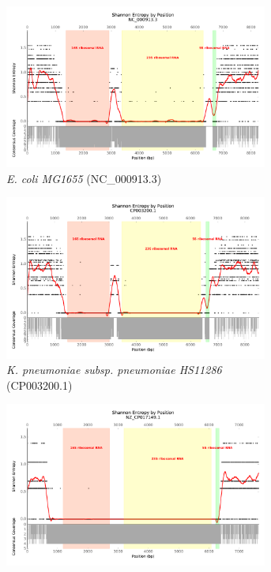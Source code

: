 \documentclass[10pt]{article}
\begin{document}
\begin{figure}[h]
  \centering
  \begin{subfigure}[b]{.45\textwidth}
    \includegraphics[width=0.95\textwidth]{gage_entropy_figures/NC_000913.3_entropy_plot}
    \caption{\textit{E. coli MG1655} (NC\_000913.3)}
    \label{fig:ent_coli}
  \end{subfigure}
  \begin{subfigure}[b]{.45\textwidth}
    \includegraphics[width=0.95\textwidth]{gage_entropy_figures/CP003200.1_entropy_plot}
    \caption{\textit{K. pneumoniae subsp. pneumoniae HS11286} (CP003200.1) }
    \label{fig:ent_pneumo}
  \end{subfigure}
  \begin{subfigure}[b]{.45\textwidth}
    \includegraphics[width=0.95\textwidth]{gage_entropy_figures/NZ_CP017149.1_entropy_plot}

\end{subfigure}
\end{figure}
\end{document}
